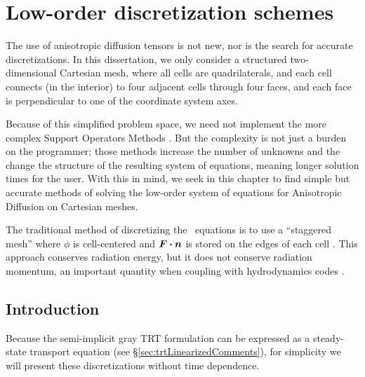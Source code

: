 
\chapter{Low-order discretization schemes} \label{chap:implementation}

The use of anisotropic diffusion tensors is not new, nor is the search for
accurate discretizations. In this dissertation, we only consider a structured
two-dimensional Cartesian mesh, where all cells are quadrilaterals, and each
cell connects (in
the interior) to four adjacent cells through four faces, and each face is
perpendicular to one of the coordinate system axes.

Because of this simplified problem space, we need not implement the more
complex Support Operators Methods \cite{Mor1998,Run2006}. But the complexity is
not just a burden on the programmer; those methods increase the number of
unknowns and the change the structure of the resulting system of equations,
meaning longer solution times for the user. With this in mind, we seek in this
chapter to find simple but accurate methods of solving the low-order system of
equations for Anisotropic Diffusion on Cartesian meshes.

The traditional method of discretizing the \Pone\ equations is to use a
``staggered mesh'' where $\phi$ is cell-centered and $\bm{F}\bm{\cdot} \bm{n}$ is
stored on the edges of each cell \cite{War2003}. This approach conserves
radiation energy, but it does not conserve radiation momentum, an important
quantity when coupling with hydrodynamics codes \cite{Pom1973}.

\section{Introduction}

Because the semi-implicit gray TRT formulation can be expressed as a
steady-state transport equation (see \S\ref{sec:trtLinearizedComments}), for
simplicity we will present these discretizations without time dependence.

